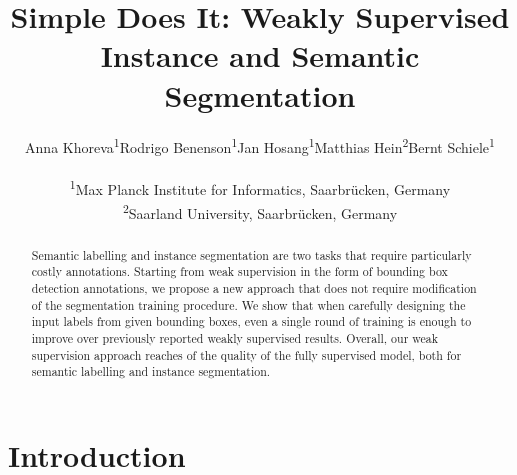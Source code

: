 \documentclass[10pt,english,british,twocolumn]{article}
\begin{document}
\let\originalparagraph\paragraph 
\renewcommand{\paragraph}[2][.]{\originalparagraph{#2#1}}

\title{Simple Does It: Weakly Supervised Instance and Semantic Segmentation}

\author{Anna Khoreva\textsuperscript{1}\hspace{1.5em}Rodrigo Benenson\textsuperscript{1}\hspace{1.5em}Jan Hosang\textsuperscript{1}\hspace{1.5em}Matthias Hein\textsuperscript{2}\hspace{1.5em}Bernt
Schiele\textsuperscript{1}\\\\\textsuperscript{1}Max Planck Institute
for Informatics, Saarbr{\"u}cken, Germany\\ \textsuperscript{2}Saarland University,
Saarbr{\"u}cken, Germany}
\maketitle
\vspace{-0.5em}
\maketitle
\begin{abstract}
Semantic labelling and instance segmentation are two tasks that require
particularly costly annotations. Starting from weak supervision in
the form of bounding box detection annotations, we propose a new approach
that does not require modification of the segmentation training procedure.
We show that when carefully designing the input labels from given
bounding boxes, even a single round of training is enough to improve
over previously reported weakly supervised results. Overall, our weak
supervision approach reaches  of the quality of the fully
supervised model, both for semantic labelling and instance segmentation.
\end{abstract}

\section{\label{sec:Introduction}Introduction}
\end{document}
